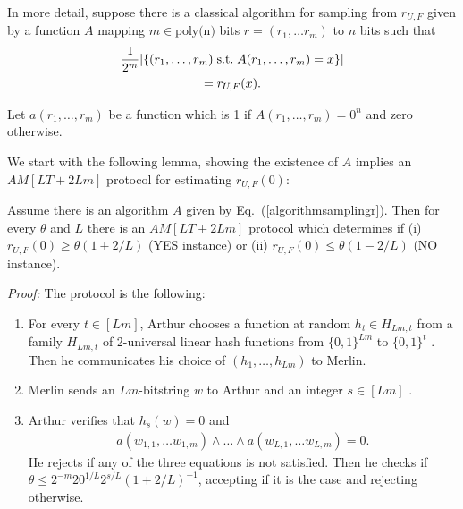 In more detail, suppose there is a classical algorithm for sampling from $r_{U, F}$ given by a function $A$ mapping $m \in \text{poly(n)}$ bits $r = (r_1, \ldots r_m)$ to $n$ bits such that
\begin{multline}  \label{algorithmsamplingr}
\frac{1}{2^m} | \{ (r_1, \ldots, r_m) \hspace{0.1 cm} \text{s.t.}   \hspace{0.1 cm} A(r_1, \ldots, r_m) = x \}  | \\ = r_{U, F}(x). 
\end{multline}

Let $a(r_1, \ldots, r_m)$ be a function which is 1 if $A(r_1, \ldots, r_m) = 0^n$ and zero otherwise. 

We start with the following lemma, showing the existence of $A$ implies an $AM[LT + 2Lm]$ protocol for estimating $r_{U, F}(0)$:

\begin{lemma} \label{AMprotcolforr}
Assume there is an algorithm $A$ given by Eq.~(\ref{algorithmsamplingr}). Then for every $\theta$ and $L$ there is an $AM[LT + 2Lm]$ protocol which determines if (i) $r_{U, F}(0) \geq \theta (1 + 2/L)$ (YES instance) or (ii) $r_{U, F}(0) \leq \theta (1 - 2/L)$ (NO instance).  
\end{lemma}

\textit{Proof:} The protocol is the following:

\begin{enumerate} 

\item For every $t \in [Lm]$, Arthur chooses a function at random $h_{t} \in H_{Lm, t}$ from a family $H_{Lm, t}$ of 2-universal linear hash functions from $\{0, 1\}^{L m}$ to  $\{0, 1 \}^t$ \cite{AB09}. Then he communicates his choice of $(h_{1}, \ldots, h_{Lm})$ to Merlin.

\item Merlin sends an $Lm$-bitstring $w$ to Arthur and an integer $s \in [Lm]$ .

\item Arthur verifies that $h_{s}(w) = 0$ and
\begin{align}
a(w_{1, 1}, \ldots w_{1, m}) \wedge \ldots \wedge a(w_{L, 1}, \ldots w_{L, m}) \nonumber = 0.
\end{align}
He rejects if any of the three equations is not satisfied. Then he checks if $\theta \leq 2^{-m} 20^{1/L} 2^{s/L} (1+2/L)^{-1}$, accepting if it is the case and rejecting otherwise.
\end{enumerate}

